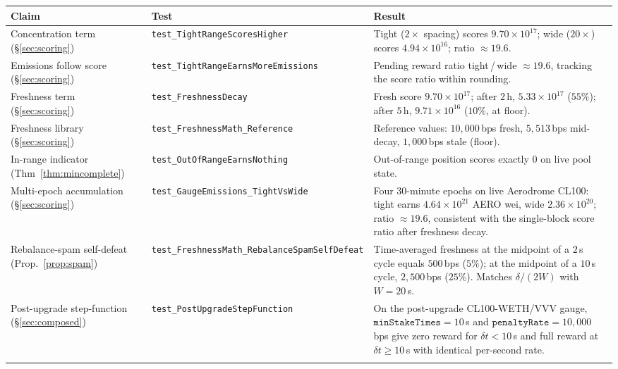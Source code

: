 \documentclass[11pt,a4paper]{article}
\theoremstyle{cgdefinition}
\theoremstyle{cgplain}
\theoremstyle{cgremark}
\begin{document}
\begin{table}[H]
\centering
\footnotesize
\begin{tabular}{@{}L{3.2cm}L{4.2cm}L{7.2cm}@{}}
\toprule
Claim & Test & Result \\
\midrule
Concentration term (\S\ref{sec:scoring}) & \texttt{test\_Tight\-Range\-Scores\-Higher} & Tight ($2\times$ spacing) scores $9.70\times 10^{17}$; wide ($20\times$) scores $4.94\times 10^{16}$; ratio $\approx 19.6$. \\
\addlinespace
Emissions follow score (\S\ref{sec:scoring}) & \texttt{test\_Tight\-Range\-Earns\-More\-Emissions} & Pending reward ratio tight\,/\,wide $\approx 19.6$, tracking the score ratio within rounding. \\
\addlinespace
Freshness term (\S\ref{sec:scoring}) & \texttt{test\_Freshness\-Decay} & Fresh score $9.70\times 10^{17}$; after $2$\,h, $5.33\times 10^{17}$ ($55\%$); after $5$\,h, $9.71\times 10^{16}$ ($10\%$, at floor). \\
\addlinespace
Freshness library (\S\ref{sec:scoring}) & \texttt{test\_Freshness\-Math\_Reference} & Reference values: $10{,}000$\,bps fresh, $5{,}513$\,bps mid-decay, $1{,}000$\,bps stale (floor). \\
\addlinespace
In-range indicator (Thm~\ref{thm:mincomplete}) & \texttt{test\_OutOf\-Range\-Earns\-Nothing} & Out-of-range position scores exactly $0$ on live pool state. \\
\addlinespace
Multi-epoch accumulation (\S\ref{sec:scoring}) & \texttt{test\_Gauge\-Emissions\_TightVs\-Wide} & Four $30$-minute epochs on live Aerodrome CL100: tight earns $4.64\times 10^{21}$ AERO wei, wide $2.36\times 10^{20}$; ratio $\approx 19.6$, consistent with the single-block score ratio after freshness decay. \\
\addlinespace
Rebalance-spam self-defeat (Prop.~\ref{prop:spam}) & \texttt{test\_Freshness\-Math\_Rebalance\-Spam\-Self\-Defeat} & Time-averaged freshness at the midpoint of a $2$\,s cycle equals $500$\,bps ($5\%$); at the midpoint of a $10$\,s cycle, $2{,}500$\,bps ($25\%$). Matches $\delta/(2W)$ with $W=20$\,s. \\
\addlinespace
Post-upgrade step-function (\S\ref{sec:composed}) & \texttt{test\_Post\-Upgrade\-Step\-Function} & On the post-upgrade CL100-WETH/VVV gauge, $\texttt{minStakeTimes} = 10$\,s and $\texttt{penaltyRate} = 10{,}000$ bps give zero reward for $\delta t < 10$\,s and full reward at $\delta t \geq 10$\,s with identical per-second rate. \\
\addlinespace

\end{tabular}
\end{table}
\end{document}
